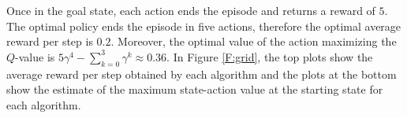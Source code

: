 Once in the goal state, each action ends the episode and returns a reward of $5$. The optimal policy ends the episode in five actions, therefore the optimal average reward per step is $0.2$. Moreover, the optimal value of the action maximizing the $Q$-value is $5\gamma^4 - \sum_{k=0}^3 \gamma^k \approx 0.36$.
In Figure \ref{F:grid}, the top plots show the average reward per step obtained by each algorithm and the plots at the bottom show the estimate of the maximum state-action value at the starting state for each algorithm.
\begin{figure}
  \begin{minipage}{\textwidth}
    \centering
    \hspace{-.5cm}

\end{minipage}
\end{figure}
